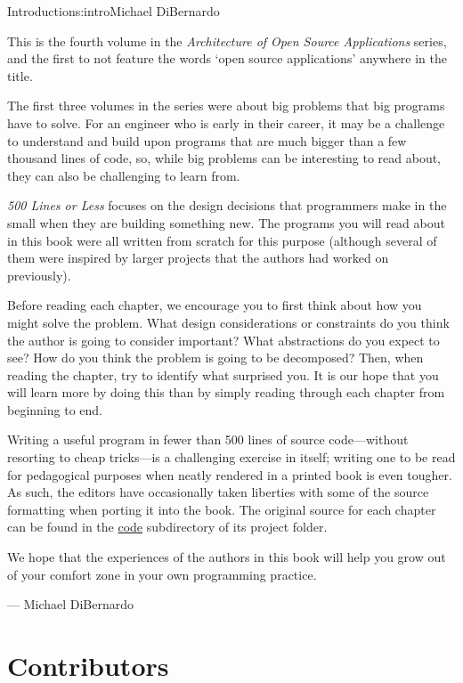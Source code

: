 \begin{aosachapter}{Introduction}{s:intro}{Michael DiBernardo}

This is the fourth volume in the \emph{Architecture of Open Source Applications}
series, and the first to not feature the words `open source applications' anywhere in the
title. 

The first three volumes in the series were about big problems that big programs
have to solve. For an engineer who is early in their career, it may be a
challenge to understand and build upon programs that are much bigger than a
few thousand lines of code, so, while big problems can be interesting to
read about, they can also be challenging to learn from.

\emph{500 Lines or Less} focuses on the design decisions that programmers make
in the small when they are building something new. The programs you will read about
in this book were all written from scratch for this purpose (although several
of them were inspired by larger projects that the authors had worked on previously).

Before reading each chapter, we encourage you to first think about
how you might solve the problem. What design considerations
or constraints do you think the author is going to consider important? What
abstractions do you expect to see? How do you think the problem is going to be decomposed?
Then, when reading the chapter, try to identify what surprised you. It is our
hope that you will learn more by doing this than by simply reading through each
chapter from beginning to end.

Writing a useful program in fewer than 500 lines of source code---without
resorting to cheap tricks---is a challenging exercise in itself; writing one to
be read for pedagogical purposes when neatly rendered in a printed book is even
tougher. As such, the editors have occasionally taken liberties with some of
the source formatting when porting it into the book. The original
source for each chapter can be found in the \url{code} subdirectory of its project folder. 

We hope that the experiences of the authors in this book will help you grow out
of your comfort zone in your own programming practice. 

\hspace{6cm} --- Michael DiBernardo

\newpage

\section*{Contributors}


\end{aosachapter}
